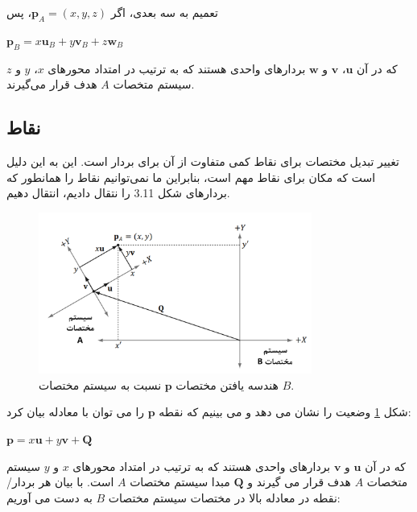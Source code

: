 {\begin{spacing}{1.5}
        تعمیم به سه بعدی، اگر $\textbf{p}_{A}=(x, y, z)$، پس

        \begin{center}
            $\textbf{p}_{B}=x\textbf{u}_{B}+y\textbf{v}_{B}+z\textbf{w}_{B}$
        \end{center}

        که در آن $\textbf{u}$، $\textbf{v}$ و $\textbf{w}$ بردارهای واحدی هستند که به ترتیب در امتداد محورهای $x$، $y$ و $z$ سیستم متخصات $A$ هدف قرار می‌گیرند.
    \end{spacing}
}

\subsection{\textbf{نقاط}}
{
    \Large
    \begin{spacing}{1.5}
        تغییر تبدیل مختصات برای نقاط کمی متفاوت از آن برای بردار است.
        این به این دلیل است که مکان برای نقاط مهم است، بنابراین ما نمی‌توانیم نقاط را همانطور که بردارهای شکل 3.11 را نتقال دادیم، انتقال دهیم.

        \begin{figure}[H]
            \centering
            \setlength{\belowcaptionskip}{-10pt}
            \includegraphics[width=0.8\textwidth]{Images/4/3/4.Session.1.3.12}
            \caption {هندسه یافتن مختصات $\textbf{p}$ نسبت به سیستم مختصات $B$.}
            \label{fig:4.Session.1.3.12}
        \end{figure}

        شکل \ref{fig:4.Session.1.3.12} وضعیت را نشان می دهد و می بینیم که نقطه $\textbf{p}$ را می توان با معادله بیان کرد:

        \begin{center}
            $\textbf{p}=x\textbf{u}+y\textbf{v}+\textbf{Q}$
        \end{center}

        که در آن $\textbf{u}$ و $\textbf{v}$ بردارهای واحدی هستند که به ترتیب در امتداد محورهای $x$ و $y$ سیستم متخصات $A$ هدف قرار می گیرند و $\textbf{Q}$ مبدا سیستم مختصات $A$ است.
با بیان هر بردار/نقطه در معادله بالا در مختصات سیستم مختصات $B$ به دست می آوریم:


\end{spacing}}
